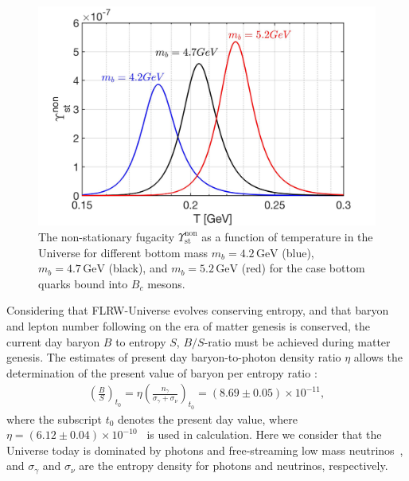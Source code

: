 \begin{figure}[t]
\centerline{\includegraphics[width=0.9\linewidth]{./plots/NonstationaryFugacity}}
\caption{The non-stationary fugacity $\Upsilon_\mathrm{st}^{\mathrm{non}}$ as a function of temperature in the Universe for different bottom mass $m_b=4.2\,\mathrm{GeV}$ (blue), $m_b=4.7\,\mathrm{GeV}$ (black), and $m_b=5.2\,\mathrm{GeV}$ (red) for the case bottom  quarks bound into $B_c$ mesons. }
\label{NonFugacity}
\end{figure}
 

 Considering that FLRW-Universe evolves conserving entropy, and that baryon and lepton number following on the era of matter genesis is conserved, the current day baryon $B$ to entropy $S$, $B/S$-ratio must be achieved during matter genesis. The estimates of present day baryon-to-photon density ratio $\eta$ allows the determination of the present value of baryon per entropy ratio \cite{Rafelski:2019twp,Letessier:2002ony,Fromerth:2002wb,Fromerth:2012fe}:
\begin{align}
\left(\frac{B}{S}\right)_{t_0}\!\!\!\!=\eta\left(\frac{n_\gamma}{\sigma_\gamma+\sigma_\nu}\right)_{\!t_0}\!\!\!\!=(8.69\pm0.05)\!\!\times\!\!10^{-11},
\end{align}
where the subscript $t_0$ denotes the present day value, where $\eta=(6.12\pm0.04)\times10^{-10}$~\cite{ParticleDataGroup:2018ovx} is used in calculation. Here we consider that the Universe today is dominated by photons and free-streaming low mass neutrinos~\cite{Birrell:2012gg}, and $\sigma_\gamma$ and $\sigma_\nu$ are the entropy density for photons and neutrinos, respectively. 
 
